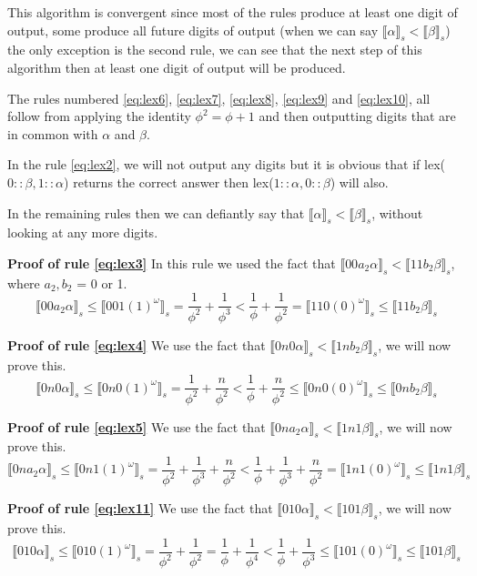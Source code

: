 \documentclass{cs4rep}
\begin{document}
This algorithm is convergent since most of the rules produce at least
one digit of output, some produce all future digits of output (when we
can say $ \llbracket \alpha \rrbracket_{s} < \llbracket \beta
\rrbracket_{s} $) the only exception is the second rule, we can see
that the next step of this algorithm then at least one digit of output
will be produced.

The rules numbered \ref{eq:lex6}, \ref{eq:lex7}, \ref{eq:lex8},
\ref{eq:lex9} and \ref{eq:lex10}, all follow from applying the
identity $\phi^{2} = \phi + 1$ and then outputting digits that are in
common with $\alpha$ and $\beta$.

In the rule \ref{eq:lex2}, we will not output any digits but it is
obvious that if lex($0::\beta, 1::\alpha$) returns the correct answer
then lex($1::\alpha,0::\beta$) will also.

In the remaining rules then we can defiantly say that $\llbracket
\alpha \rrbracket_{s} < \llbracket \beta \rrbracket_{s}$, without
looking at any more digits.

{\bf Proof of rule \ref{eq:lex3}}
In this rule we used the fact that $\llbracket 00a_{2}\alpha \rrbracket_{s} < \llbracket 11b_{2}\beta \rrbracket_{s}$, where $a_{2}, b_{2}$ = 0 or 1.
\[ \llbracket 00a_{2}\alpha \rrbracket_{s} \leq \llbracket 001(1)^{\omega} \rrbracket_{s} = \frac{1}{\phi^{2}} + \frac{1}{\phi^{3}} < \frac{1}{\phi} + \frac{1}{\phi^{2}} = \llbracket 110(0)^{\omega} \rrbracket_{s} \leq \llbracket 11b_{2}\beta \rrbracket_{s} \]

{\bf Proof of rule \ref{eq:lex4}}
We use the fact that $ \llbracket 0n0\alpha \rrbracket_{s} < \llbracket 1nb_{2}\beta \rrbracket_{s}$, we will now prove this.
\[ \llbracket 0n0\alpha \rrbracket_{s} \leq \llbracket 0n0(1)^{\omega} \rrbracket_{s} = \frac{1}{\phi^{2}} + \frac{n}{\phi^{2}} < \frac{1}{\phi} + \frac{n}{\phi^{2}} \leq \llbracket 0n0(0)^{\omega} \rrbracket_{s} \leq \llbracket 0nb_{2}\beta \rrbracket_{s} \]

{\bf Proof of rule \ref{eq:lex5}}
We use the fact that $ \llbracket 0na_{2}\alpha \rrbracket_{s} < \llbracket 1n1\beta \rrbracket_{s}$, we will now prove this.
\[ \llbracket 0na_{2}\alpha \rrbracket_{s} \leq \llbracket 0n1(1)^{\omega} \rrbracket_{s} = \frac{1}{\phi^{2}} + \frac{1}{\phi^{3}} + \frac{n}{\phi^{2}} < \frac{1}{\phi}+ \frac{1}{\phi^{3}} + \frac{n}{\phi^{2}} = \llbracket 1n1(0)^{\omega} \rrbracket_{s} \leq \llbracket 1n1\beta \rrbracket_{s} \]

{\bf Proof of rule \ref{eq:lex11}}
We use the fact that $ \llbracket 010\alpha \rrbracket_{s} < \llbracket 101\beta \rrbracket_{s}$, we will now prove this.
\[ \llbracket 010\alpha \rrbracket_{s} \leq \llbracket 010(1)^{\omega} \rrbracket_{s} = \frac{1}{\phi^{2}} + \frac{1}{\phi^{2}} = \frac{1}{\phi} + \frac{1}{\phi^{4}} < \frac{1}{\phi} + \frac{1}{\phi^{3}} \leq \llbracket 101(0)^{\omega} \rrbracket_{s} \leq \llbracket 101\beta \rrbracket_{s} \]
\end{document}
